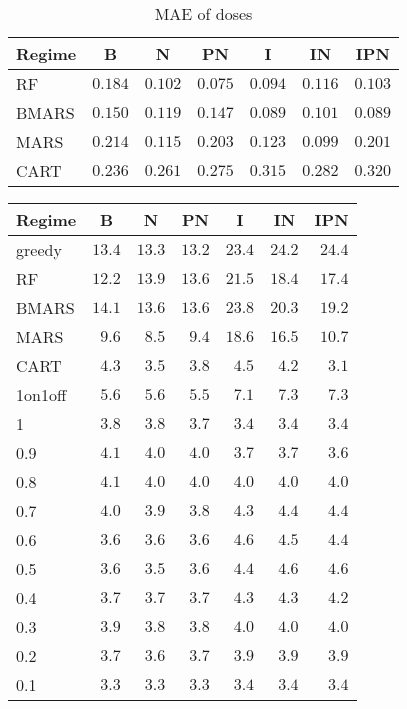 \documentclass[12pt]{article}
\begin{document}
\begin{table}[h]
\caption{MAE of doses}
\begin{center}
\begin{tabular}{lrrrrrr}
\toprule
\multicolumn{1}{c}{Regime}&\multicolumn{1}{c}{B}&\multicolumn{1}{c}{N}&\multicolumn{1}{c}{PN}&\multicolumn{1}{c}{I}&\multicolumn{1}{c}{IN}&\multicolumn{1}{c}{IPN}\tabularnewline
\midrule
RF&$0.184$&$0.102$&$0.075$&$0.094$&$0.116$&$0.103$\tabularnewline
BMARS&$0.150$&$0.119$&$0.147$&$0.089$&$0.101$&$0.089$\tabularnewline
MARS&$0.214$&$0.115$&$0.203$&$0.123$&$0.099$&$0.201$\tabularnewline
CART&$0.236$&$0.261$&$0.275$&$0.315$&$0.282$&$0.320$\tabularnewline
\bottomrule
\end{tabular}\end{center}
\end{table}


\begin{table}[h]
\begin{center}
\begin{tabular}{lrrrrrr}
\toprule
\multicolumn{1}{c}{Regime}&\multicolumn{1}{c}{B}&\multicolumn{1}{c}{N}&\multicolumn{1}{c}{PN}&\multicolumn{1}{c}{I}&\multicolumn{1}{c}{IN}&\multicolumn{1}{c}{IPN}\tabularnewline
\midrule
greedy&$13.4$&$13.3$&$13.2$&$23.4$&$24.2$&$24.4$\tabularnewline
RF&$12.2$&$13.9$&$13.6$&$21.5$&$18.4$&$17.4$\tabularnewline
BMARS&$14.1$&$13.6$&$13.6$&$23.8$&$20.3$&$19.2$\tabularnewline
MARS&$ 9.6$&$ 8.5$&$ 9.4$&$18.6$&$16.5$&$10.7$\tabularnewline
CART&$ 4.3$&$ 3.5$&$ 3.8$&$ 4.5$&$ 4.2$&$ 3.1$\tabularnewline
1on1off&$ 5.6$&$ 5.6$&$ 5.5$&$ 7.1$&$ 7.3$&$ 7.3$\tabularnewline
1&$ 3.8$&$ 3.8$&$ 3.7$&$ 3.4$&$ 3.4$&$ 3.4$\tabularnewline
0.9&$ 4.1$&$ 4.0$&$ 4.0$&$ 3.7$&$ 3.7$&$ 3.6$\tabularnewline
0.8&$ 4.1$&$ 4.0$&$ 4.0$&$ 4.0$&$ 4.0$&$ 4.0$\tabularnewline
0.7&$ 4.0$&$ 3.9$&$ 3.8$&$ 4.3$&$ 4.4$&$ 4.4$\tabularnewline
0.6&$ 3.6$&$ 3.6$&$ 3.6$&$ 4.6$&$ 4.5$&$ 4.4$\tabularnewline
0.5&$ 3.6$&$ 3.5$&$ 3.6$&$ 4.4$&$ 4.6$&$ 4.6$\tabularnewline
0.4&$ 3.7$&$ 3.7$&$ 3.7$&$ 4.3$&$ 4.3$&$ 4.2$\tabularnewline
0.3&$ 3.9$&$ 3.8$&$ 3.8$&$ 4.0$&$ 4.0$&$ 4.0$\tabularnewline
0.2&$ 3.7$&$ 3.6$&$ 3.7$&$ 3.9$&$ 3.9$&$ 3.9$\tabularnewline
0.1&$ 3.3$&$ 3.3$&$ 3.3$&$ 3.4$&$ 3.4$&$ 3.4$\tabularnewline
\bottomrule
\end{tabular}\end{center}
\end{table}
\end{document}
